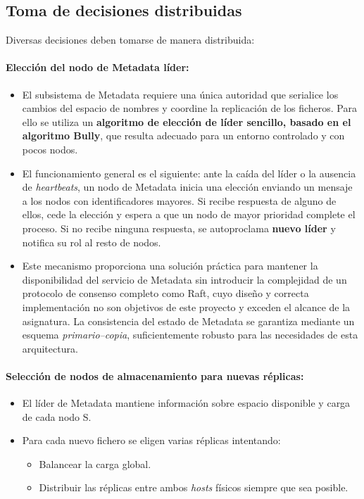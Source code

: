 \documentclass{article}
\begin{document}
\newpage

\subsection{Toma de decisiones distribuidas}
Diversas decisiones deben tomarse de manera distribuida:

\paragraph{Elección del nodo de Metadata líder:}
\begin{itemize}
    \item El subsistema de Metadata requiere una única autoridad que serialice los cambios del espacio de nombres y coordine la replicación de los ficheros. Para ello se utiliza un \textbf{algoritmo de elección de líder sencillo, basado en el algoritmo Bully}, que resulta adecuado para un entorno controlado y con pocos nodos.    
    \item El funcionamiento general es el siguiente: ante la caída del líder o la ausencia de \emph{heartbeats}, un nodo de Metadata inicia una elección enviando un mensaje a los nodos con identificadores mayores. Si recibe respuesta de alguno de ellos, cede la elección y espera a que un nodo de mayor prioridad complete el proceso. Si no recibe ninguna respuesta, se autoproclama \textbf{nuevo líder} y notifica su rol al resto de nodos.
    \item Este mecanismo proporciona una solución práctica para mantener la disponibilidad del servicio de Metadata sin introducir la complejidad de un protocolo de consenso completo como Raft, cuyo diseño y correcta implementación no son objetivos de este proyecto y exceden el alcance de la asignatura. La consistencia del estado de Metadata se garantiza mediante un esquema \emph{primario–copia}, suficientemente robusto para las necesidades de esta arquitectura.
\end{itemize}


\paragraph{Selección de nodos de almacenamiento para nuevas réplicas:}
\begin{itemize}
    \item El líder de Metadata mantiene información sobre espacio disponible y carga de cada nodo S.
    \item Para cada nuevo fichero se eligen varias réplicas intentando:
    \begin{itemize}
        \item Balancear la carga global.
        \item Distribuir las réplicas entre ambos \emph{hosts} físicos siempre que sea posible.
    \end{itemize}
\end{itemize}
\end{document}
